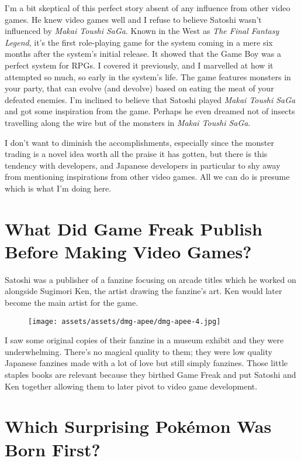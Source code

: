 \documentclass{book}
\begin{document}
I’m a bit skeptical of this perfect story absent of any influence from other video games. He knew video games well and I refuse to believe Satoshi wasn’t influenced by \emph{Makai Toushi SaGa}. Known in the West as \emph{The Final Fantasy Legend}, it’s the first role-playing game for the system coming in a mere six months after the system’s initial release. It showed that the Game Boy was a perfect system for RPGs. I covered it previously, and I marvelled at how it attempted so much, so early in the system’s life. The game features monsters in your party, that can evolve (and devolve) based on eating the meat of your defeated enemies. I’m inclined to believe that Satoshi played \emph{Makai Toushi SaGa} and got some inspiration from the game. Perhaps he even dreamed not of insects travelling along the wire but of the monsters in \emph{Makai Toushi SaGa}.

I don’t want to diminish the accomplishments, especially since the monster trading is a novel idea worth all the praise it has gotten, but there is this tendency with developers, and Japanese developers in particular to shy away from mentioning inspirations from other video games. All we can do is presume which is what I’m doing here.

\FloatBarrier\needspace{5pt}\section*{What Did Game Freak Publish Before Making Video Games?}\nopagebreak[4]

Satoshi was a publisher of a fanzine focusing on arcade titles which he worked on alongside Sugimori Ken, the artist drawing the fanzine’s art. Ken would later become the main artist for the game.

\begin{figure}[hbt]
\vskip 10pt
\centering \texttt{[image: assets/assets/dmg-apee/dmg-apee-4.jpg]}
\vskip 6pt
\end{figure}

I saw some original copies of their fanzine in a museum exhibit and they were underwhelming. There’s no magical quality to them; they were low quality Japanese fanzines made with a lot of love but still simply fanzines. Those little staples books are relevant because they birthed Game Freak and put Satoshi and Ken together allowing them to later pivot to video game development.

\FloatBarrier\needspace{5pt}\section*{Which Surprising Pokémon Was Born First?}\nopagebreak[4]
\end{document}
